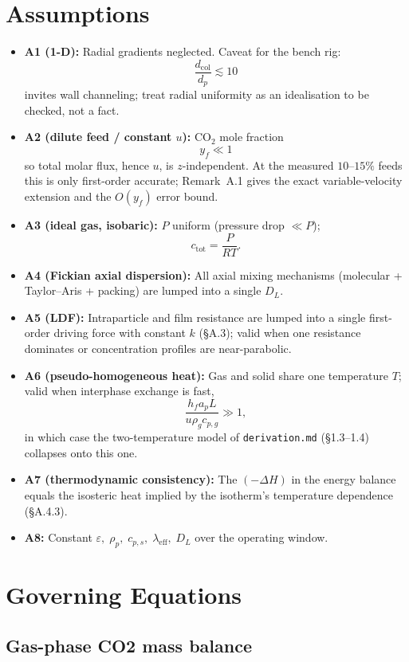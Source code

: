 \documentclass[a4paper]{amsart}
\theoremstyle{definition}
\begin{document}
\section{Assumptions}
\begin{itemize}

\item \textbf{A1 (1-D):} Radial gradients neglected. Caveat for the bench rig:
\[
    \frac{d_{\mathrm{col}}}{d_p} \lesssim 10
\]
invites wall channeling; treat radial uniformity as an idealisation to be checked, not a fact.

\medskip

\item \textbf{A2 (dilute feed / constant \(u\)):} CO$_2$ mole fraction
\[
    y_f \ll 1
\]
so total molar flux, hence \(u\), is \(z\)-independent. At the measured \(10\text{--}15\%\) feeds this is only first-order accurate; Remark~A.1 gives the exact variable-velocity extension and the \(O(y_f)\) error bound.

\medskip

\item \textbf{A3 (ideal gas, isobaric):} \(P\) uniform (pressure drop \(\ll P\));
\[
    c_{\mathrm{tot}} = \frac{P}{RT}.
\]

\medskip

\item \textbf{A4 (Fickian axial dispersion):} All axial mixing mechanisms (molecular + Taylor--Aris + packing) are lumped into a single \(D_L\).

\medskip

\item \textbf{A5 (LDF):} Intraparticle and film resistance are lumped into a single first-order driving force with constant \(k\) (§A.3); valid when one resistance dominates or concentration profiles are near-parabolic.

\medskip

\item \textbf{A6 (pseudo-homogeneous heat):} Gas and solid share one temperature \(T\); valid when interphase exchange is fast,
\[
    \frac{h_f a_p L}{u \rho_g c_{p,g}} \gg 1,
\]
in which case the two-temperature model of \texttt{derivation.md} (§1.3--1.4) collapses onto this one.

\medskip

\item \textbf{A7 (thermodynamic consistency):} The \((-\Delta H)\) in the energy balance equals the isosteric heat implied by the isotherm's temperature dependence (§A.4.3).

\medskip

\item \textbf{A8:} Constant $
    \varepsilon,\;
    \rho_p,\;
    c_{p,s},\;
    \lambda_{\mathrm{eff}},\;
    D_L
$
over the operating window.

\end{itemize}

\section{Governing Equations}

\subsection{Gas-phase CO2 mass balance}\mbox{}\\
\end{document}
